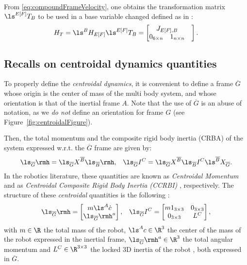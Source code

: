From \eqref{eq:compoundFrameVelocity}, one obtains the transformation matrix $\ls^{E[F]} T_{B}$ to be used in a base variable changed defined as in :
\begin{equation}
H_T = \ls^B H_{E[F]} \\ 
\ls^{E[F]} T_{B} =
\begin{bmatrix}
\multicolumn{2}{c}{J_{E[F],B}} & \\
0_{6 \times n} & 1_{n \times n} 
\end{bmatrix}.
\end{equation}


\subsection{Recalls on centroidal dynamics quantities}
To properly define the \emph{centroidal dynamics}, it is convenient to define a frame $\overline{G}$ whose origin is the center of mass of the multi body system, and whose orientation is that of the inertial frame $A$.
Note that the use of $\overline{G}$ is an abuse of notation, as we \emph{do not} define an orientation for frame $G$ (see Figure~\ref{fig:centroidalFigure}).

Then, the total  momentum and the composite rigid body inertia (CRBA) of the system expressed w.r.t. the $\overline{G}$ frame are given by: 
\begin{align}
\label{eq:centroidalMomentum}
\ls_{\overline{G}} \rmh = \ls_{\overline{G}} X^{\overline{B}} \ls_{\overline{B}} \rmh, && \ls_{\overline{G}} I^C = \ls_{\overline{G}} X^{\overline{B}} \ls_{\overline{B}} I^C  \ls^{\overline{B}} X_{\overline{G}}.
\end{align}
In the robotics literature, these quantities are known as  \emph{Centroidal Momentum} and as \emph{Centroidal Composite Rigid Body Inertia (CCRBI)}  \citep{Orin2013}, respectively.
The structure of these \emph{centroidal} quantities is the following \citep{Orin2013} :
\begin{align}
\label{eq:centroidalMomentumStructure}
\ls_{\overline{G}} \rmh = 
\begin{bmatrix}
m \ls^A \dot{c} \\
\ls_{\overline{G}} \rmh^a
\end{bmatrix},
&& 
\ls_{\overline{G}} I^C = 
\begin{bmatrix}
m 1_{3\times3} & 0_{3\times3} \\
0_{3\times3}   & L^C
\end{bmatrix},
\end{align}
with $m \in \R$ the total mass of the robot, $\ls^A c \in \R^3$ the center of the mass of the robot expressed in the inertial frame, $\ls_{\overline{G}} \rmh^a \in \R^3$ the total angular momentum and $L^C \in \R^{3\times3}$ the locked 3D inertia of the robot , both expressed in $\overline{G}$.

